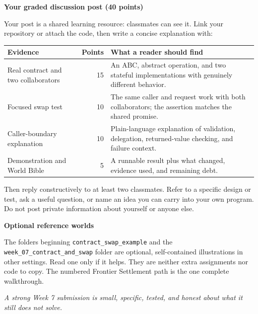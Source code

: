 \documentclass[11pt]{article}
\newcommand{\code}[1]{\texttt{#1}}
\newcommand{\heading}[1]{\vspace{0.6em}\noindent\colorbox{softblue}{\parbox{\dimexpr\linewidth-2\fboxsep}{\large\bfseries\color{navy}#1}}\vspace{0.25em}}
\begin{document}
\heading{Your graded discussion post (40 points)}
Your post is a shared learning resource: classmates can see it. Link your
repository or attach the code, then write a concise explanation with:
\begin{center}
\begin{tabular}{@{}p{1.6in}r p{3.45in}@{}}
\toprule
\textbf{Evidence} & \textbf{Points} & \textbf{What a reader should find}\\
\midrule
Real contract and two collaborators & 15 & An ABC, abstract operation, and two stateful implementations with genuinely different behavior.\\
Focused swap test & 10 & The same caller and request work with both collaborators; the assertion matches the shared promise.\\
Caller-boundary explanation & 10 & Plain-language explanation of validation, delegation, returned-value checking, and failure context.\\
Demonstration and World Bible & 5 & A runnable result plus what changed, evidence used, and remaining debt.\\
\bottomrule
\end{tabular}
\end{center}
Then reply constructively to at least two classmates. Refer to a specific
design or test, ask a useful question, or name an idea you can carry into your
own program. Do not post private information about yourself or anyone else.

\heading{Optional reference worlds}
The folders beginning \code{contract\_swap\_example} and the
\code{week\_07\_contract\_and\_swap} folder are optional, self-contained
illustrations in other settings. Read one only if it helps. They are neither
extra assignments nor code to copy. The numbered Frontier Settlement path is
the one complete walkthrough.

\vfill
\noindent\textit{A strong Week 7 submission is small, specific, tested, and
honest about what it still does not solve.}
\end{document}

